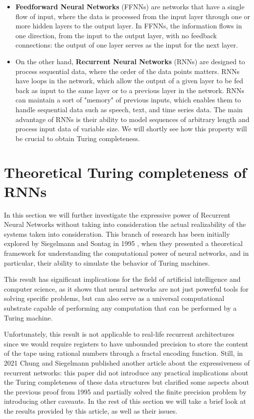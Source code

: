 \documentclass{article}
\begin{document}
\begin{itemize}
    \item \textbf{Feedforward Neural Networks} (FFNNs) are networks that have a single flow of input, where the data is processed from the input layer through one or more hidden layers to the output layer. In FFNNs, the information flows in one direction, from the input to the output layer, with no feedback connections: the output of one layer serves as the input for the next layer.

    \item On the other hand, \textbf{Recurrent Neural Networks} (RNNs) are designed to process sequential data, where the order of the data points matters. RNNs have loops in the network, which allow the output of a given layer to be fed back as input to the same layer or to a previous layer in the network. RNNs can maintain a sort of "memory" of previous inputs, which enables them to handle sequential data such as speech, text, and time series data. The main advantage of RNNs is their ability to model sequences of arbitrary length and process input data of variable size. We will shortly see how this property will be crucial to obtain Turing completeness.
\end{itemize}

\section{Theoretical Turing completeness of RNNs}\label{sec:theoretical}

In this section we will further investigate the expressive power of Recurrent Neural Networks without taking into consideration the actual realizability of the systems taken into consideration. This branch of research has been initially explored by Siegelmann and Sontag in 1995 \cite{SIE95}, when they presented a theoretical framework for understanding the computational power of neural networks, and in particular, their ability to simulate the behavior of Turing machines.

This result has significant implications for the field of artificial intelligence and computer science, as it shows that neural networks are not just powerful tools for solving specific problems, but can also serve as a universal computational substrate capable of performing any computation that can be performed by a Turing machine.

Unfortunately, this result is not applicable to real-life recurrent architectures since we would require registers to have unbounded precision to store the content of the tape using rational numbers through a fractal encoding function.
Still, in 2021 Chung and Siegelmann published another article \cite{CHU21} about the expressiveness of recurrent networks: this paper did not introduce any practical implications about the Turing completeness of these data structures but clarified some aspects about the previous proof from 1995 and partially solved the finite precision problem by introducing other caveauts. In the rest of this section we will take a brief look at the results provided by this article, as well as their issues.
\end{document}
